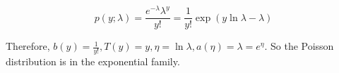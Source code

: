 \begin{answer}
	$$
	p(y;\lambda) = \frac{e^{-\lambda}\lambda^y}{y!}=\frac{1}{y!}\exp(y\ln\lambda-\lambda)
	$$
	
	Therefore, $b(y)=\frac{1}{y!},T(y)=y,\eta=\ln \lambda,a(\eta)=\lambda=e^\eta$. So the Poisson distribution is in the exponential family.
\end{answer}

